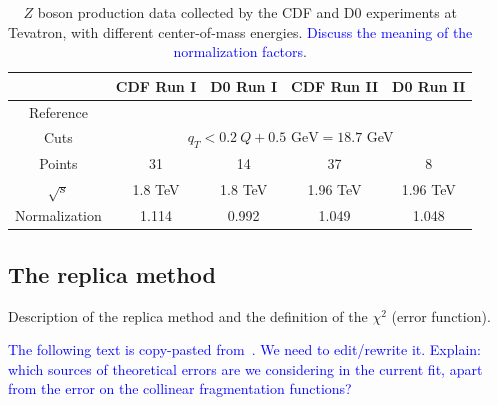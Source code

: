 \documentclass[aps,preprintnumbers,showpacs,nofootinbib,superscriptaddress,floatfix]{revtex4}
\begin{document}
\begin{table}[h!]
\begin{center}
\renewcommand{\tabcolsep}{0.4pc} %
\renewcommand{\arraystretch}{1.2} %
\begin{tabular}{|c|c|c|c|c|}
 \hline
 ~                        & CDF Run I    &  D0 Run I        & CDF Run II        & D0 Run II      \\
 \hline
 Reference        &\cite{Affolder:1999jh} &\cite{Abbott:1999wk}&\cite{Aaltonen:2012fi}&\cite{Abazov:2007ac} \\
\hline
Cuts             & \multicolumn{4}{c|}{$q_T< 0.2\ Q +0.5 \text{ GeV}=18.7$ GeV}                                  \\
\hline
 Points                   &      31      &   14             &       37          &        8       \\
 \hline
 $\sqrt{s}$               &      1.8 TeV &   1.8 TeV        &       1.96 TeV    &       1.96 TeV   \\
 \hline
Normalization        &  1.114       &    0.992          &       1.049        &       1.048    \\
\hline
\end{tabular}
\caption{$Z$ boson production data collected by the CDF and D0 experiments at Tevatron, with different center-of-mass energies. \textcolor{blue}{Discuss the meaning of the normalization factors}.}
\end{center}
\label{t:data_Z}
\end{table}



\subsection{The replica method}
\label{ss:replica_method}

Description of the replica method and the definition of the $\chi^2$ (error function).

\textcolor{blue}{The following text is copy-pasted from~\cite{Signori:2013mda}. We need to edit/rewrite it. Explain: which sources of theoretical errors are we considering in the current fit, apart from the error on the collinear fragmentation functions?}
\end{document}
